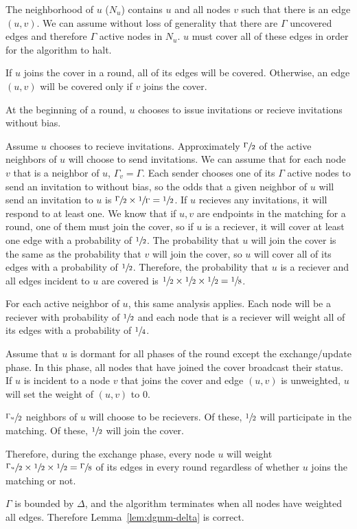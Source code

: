 \begin{IEEEproof}
The neighborhood of $u$ ($N_u$) contains $u$ and all nodes $v$ such that there is an edge $(u,v)$. We can assume without loss of generality that there are $\Gamma$ uncovered edges and therefore $\Gamma$ active nodes in $N_u$. $u$ must cover all of these edges in order for the algorithm to halt. 

If $u$ joins the cover in a round, all of its edges will be covered. Otherwise, an edge $(u,v)$ will be covered only if $v$ joins the cover.

At the beginning of a round, $u$ chooses to issue invitations or recieve invitations without bias.

Assume $u$ chooses to recieve invitations. Approximately $\sfrac{\Gamma}{2}$ of the active neighbors of $u$ will choose to send invitations. We can assume that for each node $v$ that is a neighbor of $u$, $\Gamma_v = \Gamma$. Each sender chooses one of its $\Gamma$ active nodes to send an invitation to without bias, so the odds that a given neighbor of $u$ will send an invitation to $u$ is $\sfrac{\Gamma}{2} \times \sfrac{1}{\Gamma} = \sfrac{1}{2}$. If $u$ recieves any invitations, it will respond to at least one. We know that if $u,v$ are endpoints in the matching for a round, one of them must join the cover, so if $u$ is a reciever, it will cover at least one edge with a probability of $\sfrac{1}{2}$. The probability that $u$ will join the cover is the same as the probability that $v$ will join the cover, so $u$ will cover all of its edges with a probability of $\sfrac{1}{2}$. Therefore, the probability that $u$ is a reciever and all edges incident to $u$ are covered is $\sfrac{1}{2} \times \sfrac{1}{2} \times \sfrac{1}{2} = \sfrac{1}{8}$.

For each active neighbor of $u$, this same analysis applies. Each node will be a reciever with probability of $\sfrac{1}{2}$ and each node that is a reciever will weight all of its edges with a probability of $\sfrac{1}{4}$.

Assume that $u$ is dormant for all phases of the round except the exchange/update phase. In this phase, all nodes that have joined the cover broadcast their status. If $u$ is incident to a node $v$ that joins the cover and edge $(u,v)$ is unweighted, $u$ will set the weight of $(u,v)$ to 0. 

$\sfrac{\Gamma_u}{2}$ neighbors of $u$ will choose to be recievers. Of these, $\sfrac{1}{2}$ will participate in the matching. Of these, $\sfrac{1}{2}$ will join the cover.

Therefore, during the exchange phase, every node $u$ will weight $\sfrac{\Gamma_u}{2} \times \sfrac{1}{2} \times \sfrac{1}{2} = \sfrac{\Gamma}{8}$ of its edges in every round regardless of whether $u$ joins the matching or not. 

$\Gamma$ is bounded by $\Delta$, and the algorithm terminates when all nodes have weighted all edges. Therefore Lemma~\ref{lem:dgmm-delta} is correct.
\end{IEEEproof}

